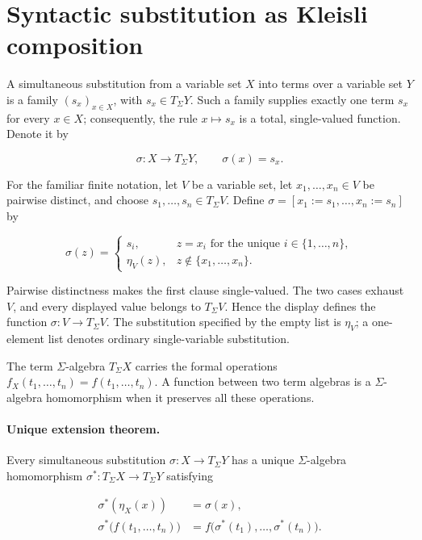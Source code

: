 \documentclass[11pt]{article}
\theoremstyle{definition}
\begin{document}
\section{Syntactic substitution as Kleisli
composition}\label{syntactic-substitution-as-kleisli-composition}

A simultaneous substitution from a variable set \(X\) into terms over a
variable set \(Y\) is a family \((s_x)_{x\in X}\), with
\(s_x\in T_\Sigma Y\). Such a family supplies exactly one term \(s_x\) for
every \(x\in X\); consequently, the rule \(x\mapsto s_x\) is a total,
single-valued function. Denote it by

\[
\sigma:X\longrightarrow T_\Sigma Y,
\qquad \sigma(x)=s_x.
\]

For the familiar finite notation, let \(V\) be a variable set, let
\(x_1,\ldots,x_n\in V\) be pairwise distinct, and choose
\(s_1,\ldots,s_n\in T_\Sigma V\). Define
\(\sigma=[x_1:=s_1,\ldots,x_n:=s_n]\) by

\[
\sigma(z)=
\begin{cases}
s_i,&z=x_i\text{ for the unique }i\in\{1,\ldots,n\},\\
\eta_V(z),&z\notin\{x_1,\ldots,x_n\}.
\end{cases}
\]

Pairwise distinctness makes the first clause single-valued. The two cases
exhaust \(V\), and every displayed value belongs to \(T_\Sigma V\). Hence the
display defines the function \(\sigma:V\to T_\Sigma V\). The substitution specified by the empty list is
\(\eta_V\); a one-element list denotes ordinary single-variable substitution.

The term \(\Sigma\)-algebra \(T_\Sigma X\) carries the formal operations
\(f_X(t_1,\ldots,t_n)=f(t_1,\ldots,t_n)\). A function between two term
algebras is a \(\Sigma\)-algebra homomorphism when it preserves all these
operations.

\paragraph{Unique extension theorem.}
Every simultaneous substitution \(\sigma:X\to T_\Sigma Y\) has a unique
\(\Sigma\)-algebra homomorphism
\(\sigma^*:T_\Sigma X\to T_\Sigma Y\) satisfying

\[
\begin{aligned}
\sigma^*(\eta_X(x))&=\sigma(x),\\
\sigma^*\bigl(f(t_1,\ldots,t_n)\bigr)
&=f\bigl(\sigma^*(t_1),\ldots,\sigma^*(t_n)\bigr).
\end{aligned}
\]
\end{document}
